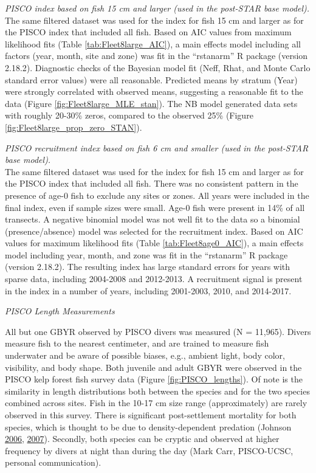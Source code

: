 \documentclass[12pt,]{article}
\begin{document}
\emph{PISCO index based on fish 15 cm and larger (used in the post-STAR
base model).}\\
The same filtered dataset was used for the index for fish 15 cm and
larger as for the PISCO index that included all fish. Based on AIC
values from maximum likelihood fits (Table \ref{tab:Fleet8large_AIC}), a
main effects model including all factors (year, month, site and zone)
was fit in the ``rstanarm'' R package (version 2.18.2). Diagnostic
checks of the Bayesian model fit (Neff, Rhat, and Monte Carlo standard
error values) were all reasonable. Predicted means by stratum (Year)
were strongly correlated with observed means, suggesting a reasonable
fit to the data (Figure \ref{fig:Fleet8large_MLE_stan}). The NB model
generated data sets with roughly 20-30\% zeros, compared to the observed
25\% (Figure \ref{fig:Fleet8large_prop_zero_STAN}).

\emph{PISCO recruitment index based on fish 6 cm and smaller (used in
the post-STAR base model).}\\
The same filtered dataset was used for the index for fish 15 cm and
larger as for the PISCO index that included all fish. There was no
consistent pattern in the presence of age-0 fish to exclude any sites or
zones. All years were included in the final index, even if sample sizes
were small. Age-0 fish were present in 14\% of all transects. A negative
binomial model was not well fit to the data so a binomial
(presence/absence) model was selected for the recruitment index. Based
on AIC values for maximum likelihood fits (Table
\ref{tab:Fleet8age0_AIC}), a main effects model including year, month,
and zone was fit in the ``rstanarm'' R package (version 2.18.2). The
resulting index has large standard errors for years with sparse data,
including 2004-2008 and 2012-2013. A recruitment signal is present in
the index in a number of years, including 2001-2003, 2010, and
2014-2017.

\emph{PISCO Length Measurements}

All but one GBYR observed by PISCO divers was measured (N = 11,965).
Divers measure fish to the nearest centimeter, and are trained to
measure fish underwater and be aware of possible biases, e.g., ambient
light, body color, visibility, and body shape. Both juvenile and adult
GBYR were observed in the PISCO kelp forest fish survey data (Figure
\ref{fig:PISCO_lengths}). Of note is the similarity in length
distributions both between the species and for the two species combined
across sites. Fish in the 10-17 cm size range (approximately) are rarely
observed in this survey. There is significant post-settlement mortality
for both species, which is thought to be due to density-dependent
predation (Johnson \protect\hyperlink{ref-Johnson2006}{2006},
\protect\hyperlink{ref-Johnson2007}{2007}). Secondly, both species can
be cryptic and observed at higher frequency by divers at night than
during the day (Mark Carr, PISCO-UCSC, personal communication).
\end{document}
